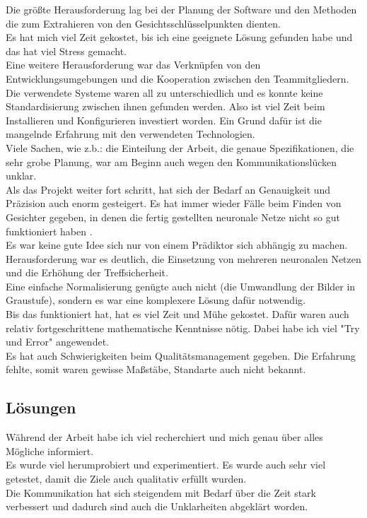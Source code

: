 \begin{flushleft}


Die größte Herausforderung lag bei der Planung der Software und den Methoden
die zum Extrahieren von den Gesichtsschlüsselpunkten dienten.\\
Es hat mich viel Zeit gekostet, bis ich eine geeignete Lösung gefunden habe und
das hat viel Stress gemacht. \\
Eine weitere Herausforderung war das Verknüpfen von den Entwicklungsumgebungen
und die Kooperation zwischen den Teammitgliedern. \\
Die verwendete Systeme waren all zu unterschiedlich und es konnte keine
Standardisierung zwischen ihnen gefunden werden. Also ist viel Zeit beim
Installieren und Konfigurieren investiert worden. Ein Grund dafür ist die
mangelnde Erfahrung mit den verwendeten Technologien. 
\\

Viele Sachen, wie z.b.: die Einteilung der Arbeit, die genaue Spezifikationen,
die sehr grobe Planung, war am Beginn auch wegen den
Kommunikationslücken unklar. 
\\

Als das Projekt weiter fort schritt, hat sich der Bedarf an Genauigkeit und Präzision
auch enorm gesteigert.
Es hat immer wieder Fälle beim Finden von Gesichter gegeben, in denen die fertig gestellten neuronale Netze
nicht so gut funktioniert haben . 
\\

Es war keine gute Idee sich nur von einem Prädiktor sich abhängig
zu machen. 
Herausforderung war es deutlich, die Einsetzung von mehreren neuronalen Netzen
und die Erhöhung der Treffsicherheit.
\\

Eine einfache Normalisierung genügte auch nicht (die Umwandlung der Bilder in
Graustufe), sondern es war eine komplexere Lösung dafür notwendig.
\\
Bis das funktioniert hat, hat es viel Zeit und Mühe gekostet. 
Dafür waren auch relativ fortgeschrittene mathematische Kenntnisse nötig.
Dabei habe ich viel "Try und Error" angewendet. 
\\
 
Es hat auch Schwierigkeiten beim Qualitätsmanagement gegeben. Die
Erfahrung fehlte, somit waren gewisse Maßstäbe, Standarte auch nicht bekannt. 



\subsection{Lösungen}
Während der Arbeit habe ich viel recherchiert und mich genau über alles Mögliche
informiert. 
\\

Es wurde viel herumprobiert und experimentiert. Es wurde auch sehr viel
getestet, damit die Ziele auch qualitativ erfüllt wurden. 
\\
Die Kommunikation hat sich steigendem mit Bedarf über die Zeit stark verbessert und
dadurch sind auch die Unklarheiten abgeklärt worden. 
\end{flushleft}

